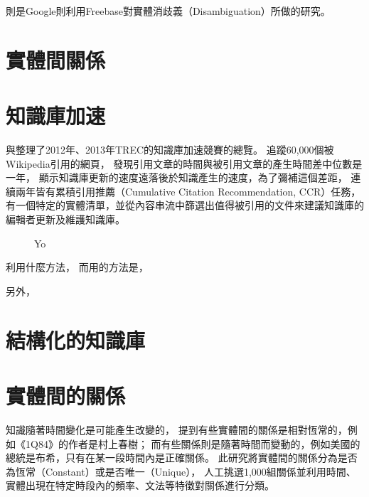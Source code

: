 \cite{freebase-google} 則是Google則利用Freebase對實體消歧義（Disambiguation）所做的研究。
\cite{dbpedia-spotlight} 

\section{實體間關係}


%
%
\section{知識庫加速}

\cite{kba2012}與\cite{kba2013}整理了2012年、2013年TREC的知識庫加速競賽的總覽。
\cite{kba2012}追蹤60,000個被Wikipedia引用的網頁，
發現引用文章的時間與被引用文章的產生時間差中位數是一年，
顯示知識庫更新的速度遠落後於知識產生的速度，為了彌補這個差距，
連續兩年皆有累積引用推薦（Cumulative Citation Recommendation, CCR）任務，   %
有一個特定的實體清單，並從內容串流中篩選出值得被引用的文件來建議知識庫的編輯者更新及維護知識庫。

\begin{figure}
    \centering
    \caption{Yo}
    \label{i:kba-corps}
\end{figure}



\cite{kba-hltoce}利用什麼方法，
而\cite{kba-msra}用的方法是，

另外，\cite{kba-entity-detection}

%
%
\section{結構化的知識庫}

\cite{freebase}
\cite{dbpedia}
\cite{yago}


\cite{aptagger}
%
%
\section{實體間的關係}

知識隨著時間變化是可能產生改變的，
\cite{relationsByTime} 提到有些實體間的關係是相對恆常的，例如《1Q84》的作者是村上春樹；
而有些關係則是隨著時間而變動的，例如美國的總統是布希，只有在某一段時間內是正確關係。
此研究將實體間的關係分為是否為恆常（Constant）或是否唯一（Unique），
人工挑選1,000組關係並利用時間、實體出現在特定時段內的頻率、文法等特徵對關係進行分類。

